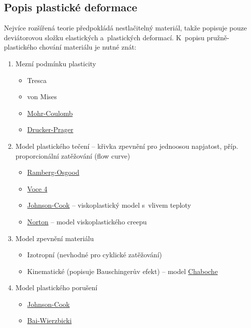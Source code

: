 \subsection{Popis plastické deformace}
Nejvíce rozšířená teorie předpokládá nestlačitelný materiál, takže popisuje pouze deviátorovou složku elastických a~plastických deformací.
K~popisu pružně-plastického chování materiálu je nutné znát:
\begin{enumerate}
	\item Mezní podmínku plasticity
	\begin{itemize}
		\item Tresca
		\item von Mises
		\item \hyperref[sec:mohr-coulomb]{Mohr-Coulomb}
		\item \hyperref[sec:drucker-prager]{Drucker-Prager}
	\end{itemize}
	\item Model plastického tečení -- křivka zpevnění pro jednoosou napjatost, příp. proporcionální zatěžování (flow curve)
	\begin{itemize}
		\item \hyperref[sec:ramberg-osgood]{Ramberg-Osgood}
		\item \hyperref[sec:model-voce-4]{Voce 4}
		\item \hyperref[sec:johnson-cook-viskoplasticita]{Johnson-Cook} -- viskoplastický model s~vlivem teploty
		\item \hyperref[sec:norton]{Norton} -- model viskoplastického creepu
	\end{itemize}
	\item Model zpevnění materiálu
	\begin{itemize}
		\item Izotropní (nevhodné pro cyklické zatěžování)
		\item Kinematické (popisuje Bauschingerův efekt) -- model \hyperref[sec:chaboche]{Chaboche}
	\end{itemize}
	\item Model plastického porušení
	\begin{itemize}
		\item \hyperref[sec:johnson-cook-poruseni]{Johnson-Cook}
		\item \hyperref[sec:bai-wierzbicki]{Bai-Wierzbicki}
	\end{itemize}
\end{enumerate}


